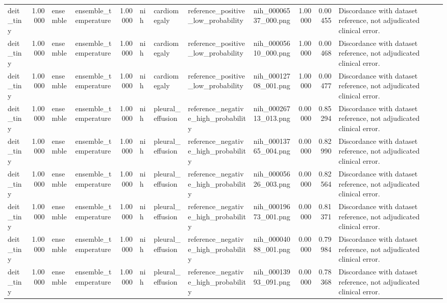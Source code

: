 \begin{tabular}{lrllrllllrrl}
deit\_tiny & 1.00000 & ensemble & ensemble\_temperature & 1.00000 & nih & cardiomegaly & reference\_positive\_low\_probability & nih\_00006537\_000.png & 1.00000 & 0.00455 & Discordance with dataset reference, not adjudicated clinical error. \\
deit\_tiny & 1.00000 & ensemble & ensemble\_temperature & 1.00000 & nih & cardiomegaly & reference\_positive\_low\_probability & nih\_00005610\_000.png & 1.00000 & 0.00468 & Discordance with dataset reference, not adjudicated clinical error. \\
deit\_tiny & 1.00000 & ensemble & ensemble\_temperature & 1.00000 & nih & cardiomegaly & reference\_positive\_low\_probability & nih\_00012708\_001.png & 1.00000 & 0.00477 & Discordance with dataset reference, not adjudicated clinical error. \\
deit\_tiny & 1.00000 & ensemble & ensemble\_temperature & 1.00000 & nih & pleural\_effusion & reference\_negative\_high\_probability & nih\_00026713\_013.png & 0.00000 & 0.85294 & Discordance with dataset reference, not adjudicated clinical error. \\
deit\_tiny & 1.00000 & ensemble & ensemble\_temperature & 1.00000 & nih & pleural\_effusion & reference\_negative\_high\_probability & nih\_00013765\_004.png & 0.00000 & 0.82990 & Discordance with dataset reference, not adjudicated clinical error. \\
deit\_tiny & 1.00000 & ensemble & ensemble\_temperature & 1.00000 & nih & pleural\_effusion & reference\_negative\_high\_probability & nih\_00005626\_003.png & 0.00000 & 0.82564 & Discordance with dataset reference, not adjudicated clinical error. \\
deit\_tiny & 1.00000 & ensemble & ensemble\_temperature & 1.00000 & nih & pleural\_effusion & reference\_negative\_high\_probability & nih\_00019673\_001.png & 0.00000 & 0.81371 & Discordance with dataset reference, not adjudicated clinical error. \\
deit\_tiny & 1.00000 & ensemble & ensemble\_temperature & 1.00000 & nih & pleural\_effusion & reference\_negative\_high\_probability & nih\_00004088\_001.png & 0.00000 & 0.79984 & Discordance with dataset reference, not adjudicated clinical error. \\
deit\_tiny & 1.00000 & ensemble & ensemble\_temperature & 1.00000 & nih & pleural\_effusion & reference\_negative\_high\_probability & nih\_00013993\_091.png & 0.00000 & 0.78368 & Discordance with dataset reference, not adjudicated clinical error. \\

\end{tabular}
